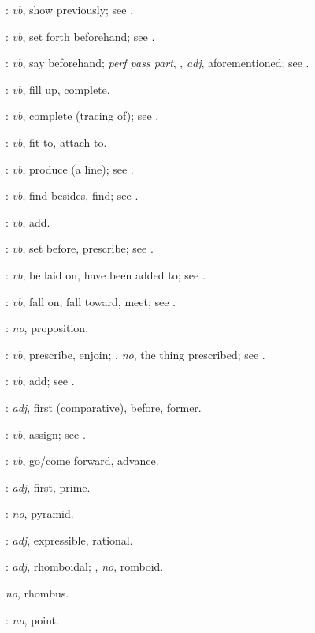 {\begin{description}
\item[]: {\em vb}, show
previously; see .
\item[]: {\em vb}, set forth beforehand; see .
\item[]: {\em vb}, say beforehand; 
{\em perf pass part}, , {\em adj}, aforementioned;
see .
\item[]: {\em vb}, fill up, complete.
\item[]: {\em vb}, complete (tracing of); see .
\item[]: {\em vb}, fit to, attach to.
\item[]: {\em vb}, produce (a line); see .
\item[]: {\em vb}, find besides, find; see .
\item[]: {\em vb}, add.
\item[]: {\em vb}, set before, prescribe; see .
\item[]: {\em vb}, be laid on, have been added to; see .
\item[]: {\em vb}, fall on, fall toward, meet; see .
\item[]: {\em no}, proposition.
\item[]: {\em vb}, prescribe, enjoin; , {\em no}, the thing prescribed; see .
\item[]: {\em vb}, add; see .
\item[]: {\em adj}, first (comparative), before, former.
\item[]: {\em vb}, assign; see .
\item[]: {\em vb}, go/come forward, advance.
\item[]: {\em adj}, first, prime.
\item[]: {\em no}, pyramid.
\item[]: {\em adj}, expressible, rational.
\item[]: {\em adj}, rhomboidal; ,
{\em no}, romboid.
\item[] {\em no}, rhombus.
\item[]: {\em no}, point.

\end{description}}
